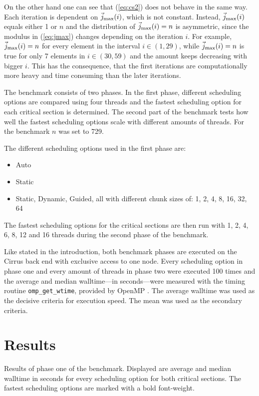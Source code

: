\documentclass[twoside,11pt]{article}
\begin{document}
On the other hand one can see that (\ref{eq:cs2}) does not
behave in the same way.
Each iteration is dependent on $\vec{j}_{\text{max} }(i)$, which is not
constant.
Instead, $\vec{j}_{\text{max} }(i)$ equals either 1 or $n$ and the
distribution of $\vec{j}_{\text{max} }(i) = n$ is asymmetric, since
the modulus in (\ref{eq:jmax}) changes depending on the
iteration $i$.
For example, $\vec{j}_{\text{max} }(i) = n$ for every element in the
interval $i \in (1, 29)$, while $\vec{j}_{\text{max} }(i) = n$ is true for
only 7 elements in $i \in (30, 59)$ and the amount keeps
decreasing with bigger $i$.
This has the consequence, that the first iterations are
computationally more heavy and time consuming than
the later iterations.

The benchmark consists of two phases.
In the first phase, different scheduling options are
compared using four threads and the fastest scheduling
option for each critical section is determined.
The second part of the benchmark tests how well the
fastest scheduling options scale with different amounts of
threads.
For the benchmark $n$ was set to 729.

The different scheduling options used in the first phase
are:
\begin{itemize}
  \item Auto
  \item Static
  \item Static, Dynamic, Guided, all with different
    chunk sizes of: 1, 2, 4, 8, 16, 32, 64
\end{itemize}

The fastest scheduling options for the critical sections
are then run with 1, 2, 4, 6, 8, 12 and 16 threads during
the second phase of the benchmark.

Like stated in the introduction, both benchmark phases are
executed on the Cirrus back end with exclusive access to one
node.
Every scheduling option in phase one and every amount of
threads in phase two were executed 100 times and the
average and median walltime---in seconds---were measured
with the timing routine \texttt{omp\_get\_wtime}, provided
by OpenMP \citep[see][Chapter 3.4.1]{openmp}.
The average walltime was used as the decisive criteria for
execution speed.
The mean was used as the secondary criteria.


\section{Results} %

\begin{table}
\begin{center}

\caption{Results of phase one of the benchmark. Displayed
  are average and median walltime in seconds for every
  scheduling option for both critical sections. The fastest
  scheduling options are marked with a bold font-weight.}
\label{tab:p1}
\end{center}
\end{table}
\end{document}
